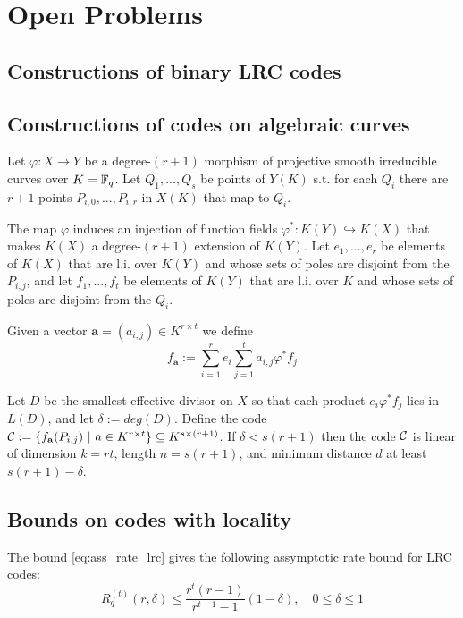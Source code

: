 \chapter{Open Problems}
\cite{MR_LRC}
\section{Constructions of binary LRC codes}
\cite{binary_constructions}

\section{Constructions of codes on algebraic curves}
\cite{LRC_on_alg_curves, LRC_on_alg_curves2, LRC_fibers}

Let $\varphi: X \rightarrow Y$ be a degree-$(r+1)$ morphism of projective smooth irreducible curves over $K={\mathbb F}_q$. Let $Q_1, ..., Q_s$ be points of $Y(K)$ s.t. for each $Q_i$ there are $r+1$ points $P_{i,0},...,P_{i,r}$ in $X(K)$ that map to $Q_i$.

The map $\varphi$ induces an injection of function fields $\varphi^\ast: K(Y) \hookrightarrow K(X)$ that makes $K(X)$ a degree-$(r+1)$ extension of $K(Y)$. Let $e_1,...,e_r$ be elements of $K(X)$ that are l.i. over $K(Y)$ and whose sets of poles are disjoint from the $P_{i,j}$, and let $f_1, ..., f_t$ be elements of $K(Y)$ that are l.i. over $K$ and whose sets of poles are disjoint from the $Q_i$.

Given a vector $\mathbf{a} = (a_{i,j}) \in K^{r \times t}$ we define
$$ f_{\mathbf{a}} := \sum_{i=1}^r e_i \sum_{j=1}^t a_{i,j} \varphi^\ast f_j$$

Let $D$ be the smallest effective divisor on $X$ so that each product $e_i \varphi^\ast f_j$ lies in $L(D)$, and let $\delta := deg(D)$.
Define the code ${\mathcal C} := \{f_{\mathbf{a}}(P_{i,j}) \ \vert \ a \in K^{r \times t}\} \subseteq K^{s \times (r+1)}$.
If $\delta < s(r+1)$ then the code ${\mathcal C}$ is linear of dimension $k=rt$, length $n = s(r+1)$, and minimum distance $d$ at least $s(r+1) - \delta$.

\section{Bounds on codes with locality}
\nocite{combinatorial_bounds}
\nocite{bounds_on_LRC}
\nocite{bounds_on_LRC_t}

The bound \ref{eq:ass_rate_lrc} gives the following assymptotic rate bound for LRC codes:
\begin{equation}
R_q^{(t)}(r,\delta) \leq \frac{r^t(r-1)}{r^{t+1}-1}(1-\delta), \quad 0 \leq \delta \leq 1
\end{equation}

